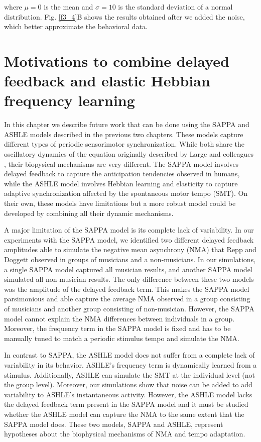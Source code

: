 \documentclass{report}
\begin{document}
where $\mu=0$ is the mean and $\sigma=10$ is the standard deviation of a normal distribution. Fig.{} \ref{f3_4}B shows the results obtained after we added the noise, which better approximate the behavioral data.

\chapter{Motivations to combine delayed feedback and elastic Hebbian frequency learning}

In this chapter we describe future work that can be done using the SAPPA and ASHLE models described in the previous two chapters. These models capture different types of periodic sensorimotor synchronization. While both share the oscillatory dynamics of the equation originally described by Large and colleagues \cite{large2010canonical}, their biopysical mechanisms are very different. The SAPPA model involves delayed feedback to capture the anticipation tendencies observed in humans, while the ASHLE model involves Hebbian learning and elasticity to capture adaptive synchronization affected by the spontaneous motor tempo (SMT). On their own, these models have limitations but a more robust model could be developed by combining all their dynamic mechanisms.

A major limitation of the SAPPA model is its complete lack of variability. In our experiments with the SAPPA model, we identified two different delayed feedback amplitudes able to simulate the negative mean asynchrony (NMA) that Repp and Doggett \cite{repp2007tapping} observed in groups of musicians and a non-musicians. In our simulations, a single SAPPA model captured all musician results, and another SAPPA model simulated all non-musician results. The only difference between these two models was the amplitude of the delayed feedback term. This makes the SAPPA model parsimonious and able capture the average NMA observed in a group consisting of musicians and another group consisting of non-musician. However, the SAPPA model cannot explain the NMA differences between individuals in a group. Moreover, the frequency term in the SAPPA model is fixed and has to be manually tuned to match a periodic stimulus tempo and simulate the NMA. 

In contrast to SAPPA, the ASHLE model does not suffer from a complete lack of variability in its behavior. ASHLE's frequency term is dynamically learned from a stimulus. Additionally, ASHLE can simulate the SMT at the individual level (not the group level). Moreover, our simulations show that noise can be added to add variability to ASHLE's instantaneous activity. However, the ASHLE model lacks the delayed feedback term present in the SAPPA model and it must be studied whether the ASHLE model can capture the NMA to the same extent that the SAPPA model does. These two models, SAPPA and ASHLE, represent hypotheses about the biophysical mechanisms of NMA and tempo adaptation.
\end{document}
